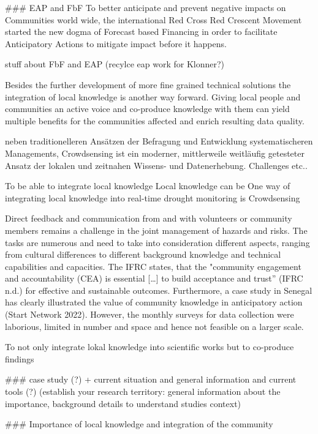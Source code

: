 \#\#\# EAP and FbF
To better anticipate and prevent negative impacts on Communities world wide, the international Red Cross Red Crescent Movement started the new dogma of Forecast based Financing in order to facilitate Anticipatory Actions to mitigate impact before it happens. 

stuff about FbF and EAP (recylce eap work for Klonner?)


Besides the further development of more fine grained technical solutions the integration of local knowledge is another way forward. Giving local people and communities an active voice and co-produce knowledge with them can yield multiple benefits for the communities affected and enrich resulting data quality. 

neben traditionelleren Ansätzen der Befragung und Entwicklung systematischeren Managements, Crowdsensing ist ein moderner, mittlerweile weitläufig getesteter Ansatz der lokalen und zeitnahen Wissens- und Datenerhebung. Challenges etc.. 


To be able to integrate local knowledge
Local knowledge can be 
One way of integrating local knowledge into real-time drought monitoring is Crowdsensing



Direct feedback and communication from and with volunteers or community members remains a challenge in the joint management of hazards and risks. The tasks are numerous and need to take into consideration different aspects, ranging from cultural differences to different background knowledge and technical capabilities and capacities. The IFRC states, that the "community engagement and accountability (CEA) is essential […] to build acceptance and trust” (IFRC n.d.) for effective and sustainable outcomes. Furthermore, a case study in Senegal has clearly illustrated the value of community knowledge in anticipatory action (Start Network 2022). However, the monthly surveys for data collection were laborious, limited in number and space and hence not feasible on a larger scale.

To not only integrate lokal knowledge into scientific works but to co-produce findings

\#\#\# case study (?) + current situation and general information and current tools (?)
(establish your research territory: general information about the importance, background details to understand studies context)


\#\#\# Importance of local knowledge and integration of the community

